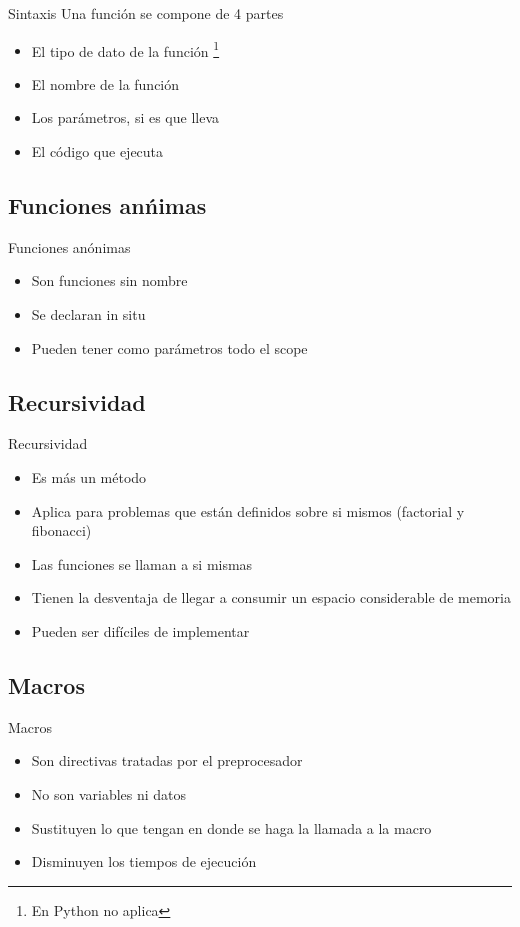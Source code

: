 \documentclass{beamer}
\begin{document}
\begin{frame}{Sintaxis}
	Una funci\'on se compone de 4 partes
	\begin{itemize}
		\item El tipo de dato de la funci\'on \footnote{En Python no aplica}
		\item El nombre de la funci\'on
		\item Los par\'ametros, si es que lleva
		\item El c\'odigo que ejecuta
	\end{itemize}
\end{frame}

\subsection{Funciones an\'nimas}

\begin{frame}{Funciones an\'onimas}
	\begin{itemize}
		\item Son funciones sin nombre
		\item Se declaran in situ
		\item Pueden tener como par\'ametros todo el scope
	\end{itemize}
\end{frame}

\subsection{Recursividad}

\begin{frame}{Recursividad}
	\begin{itemize}
		\item Es m\'as un m\'etodo
		\item Aplica para problemas que est\'an definidos sobre si mismos (factorial y fibonacci)
		\item Las funciones se llaman a si mismas
		\item Tienen la desventaja de llegar a consumir un espacio considerable de memoria
		\item Pueden ser dif\'iciles de implementar
	\end{itemize}
	\centering
\end{frame}

\subsection{Macros}
\begin{frame}{Macros}
	\begin{itemize}
		\item Son directivas tratadas por el preprocesador
		\item No son variables ni datos
		\item Sustituyen lo que tengan en donde se haga la llamada a la macro
		\item Disminuyen los tiempos de ejecuci\'on
	\end{itemize}
\end{frame}
\end{document}
